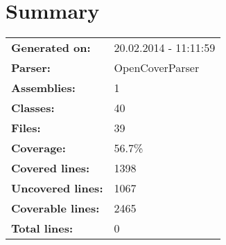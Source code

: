 \documentclass[a4paper,10pt]{article}
\begin{document}
\setcounter{secnumdepth}{-1}
\section{Summary}
\begin{longtable}[l]{ll}
\textbf{Generated on:} & 20.02.2014 - 11:11:59\\
\textbf{Parser:} & OpenCoverParser\\
\textbf{Assemblies:} & 1\\
\textbf{Classes:} & 40\\
\textbf{Files:} & 39\\
\textbf{Coverage:} & 56.7\%\\
\textbf{Covered lines:} & 1398\\
\textbf{Uncovered lines:} & 1067\\
\textbf{Coverable lines:} & 2465\\
\textbf{Total lines:} & 0\\
\end{longtable}
\end{document}
